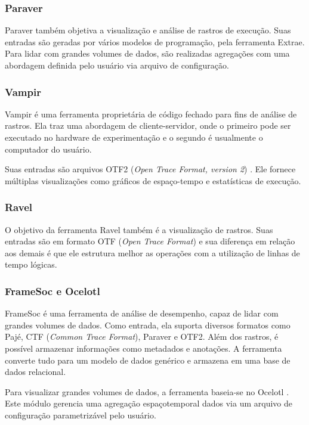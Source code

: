 \subsubsection*{Paraver}
Paraver \cite{ref:paraver} também objetiva a visualização e análise de 
rastros de execução. Suas entradas são geradas por vários modelos de 
programação, pela ferramenta Extrae. Para lidar com grandes volumes de 
dados, são realizadas agregações com uma abordagem definida pelo usuário 
via arquivo de configuração.


\subsubsection*{Vampir}
Vampir \cite{ref:vampir} é uma ferramenta proprietária de código fechado para 
fins de análise de rastros. Ela traz uma abordagem de cliente-servidor, 
onde o primeiro pode ser executado no hardware de experimentação e o segundo é
usualmente o computador do usuário.

Suas entradas são arquivos OTF2 (\textit{Open Trace Format, version 2}) 
\cite{ref:otf2}. Ele fornece múltiplas visualizações como gráficos de 
espaço-tempo e estatísticas de execução.

\subsubsection*{Ravel}
O objetivo da ferramenta Ravel \cite{ref:ravel} também é a visualização de 
rastros. Suas entradas são em formato OTF (\textit{Open Trace Format}) e 
sua diferença em relação aos demais é que ele estrutura melhor as 
operações com a utilização de linhas de tempo lógicas.

\subsubsection*{FrameSoc e Ocelotl}

FrameSoc \cite{ref:framesoc} é uma ferramenta de análise de desempenho, capaz 
de lidar com grandes volumes de dados. Como entrada, ela suporta diversos
formatos como Pajé, CTF (\textit{Common Trace Format}), Paraver e OTF2. Além 
dos rastros, é possível armazenar informações como metadados e anotações. A 
ferramenta converte tudo para um modelo de dados genérico e armazena em uma base 
de dados relacional.

Para visualizar grandes volumes de dados, a ferramenta baseia-se no Ocelotl 
\cite{ref:ocelotl}. Este módulo gerencia uma agregação espaçotemporal dados via 
um arquivo de configuração parametrizável pelo usuário.

